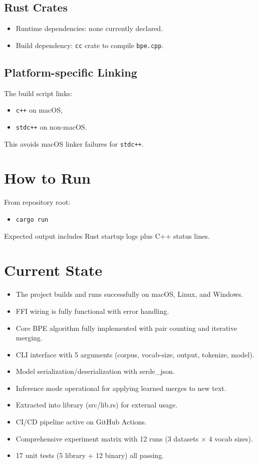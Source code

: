 \documentclass[11pt]{article}
\begin{document}
\subsection{Rust Crates}
\begin{itemize}[leftmargin=1.2em]
  \item Runtime dependencies: none currently declared.
  \item Build dependency: \texttt{cc} crate to compile \texttt{bpe.cpp}.
\end{itemize}

\subsection{Platform-specific Linking}
The build script links:
\begin{itemize}[leftmargin=1.2em]
  \item \texttt{c++} on macOS,
  \item \texttt{stdc++} on non-macOS.
\end{itemize}
This avoids macOS linker failures for \texttt{stdc++}.

\section{How to Run}
From repository root:
\begin{itemize}[leftmargin=1.2em]
  \item \texttt{cargo run}
\end{itemize}
Expected output includes Rust startup logs plus C++ status lines.

\section{Current State}
\begin{itemize}[leftmargin=1.2em]
  \item The project builds and runs successfully on macOS, Linux, and Windows.
  \item FFI wiring is fully functional with error handling.
  \item Core BPE algorithm fully implemented with pair counting and iterative merging.
  \item CLI interface with 5 arguments (corpus, vocab-size, output, tokenize, model).
  \item Model serialization/deserialization with serde\_json.
  \item Inference mode operational for applying learned merges to new text.
  \item Extracted into library (src/lib.rs) for external usage.
  \item CI/CD pipeline active on GitHub Actions.
  \item Comprehensive experiment matrix with 12 runs (3 datasets $\times$ 4 vocab sizes).
  \item 17 unit tests (5 library + 12 binary) all passing.
\end{itemize}
\end{document}
